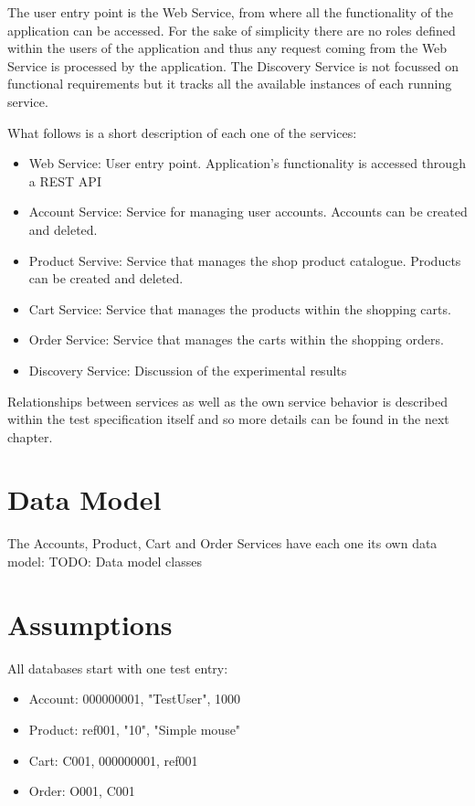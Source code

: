 The user entry point is the Web Service, from where all the functionality of the application can be accessed. For the sake of simplicity there are no roles defined within the users of the application and thus any request coming from the Web Service is processed by the application.
The Discovery Service is not focussed on functional requirements but it tracks all the available instances of each running service.

What follows is a short description of each one of the services:
\begin{itemize}
\item Web Service: User entry point. Application's functionality is accessed through a REST API 
\item Account Service: Service for managing user accounts. Accounts can be created and deleted.
\item Product Servive: Service that manages the shop product catalogue. Products can be created and deleted.
\item Cart Service: Service that manages the products within the shopping carts.
\item Order Service: Service that manages the carts within the shopping orders.
\item Discovery Service: Discussion of the experimental results
\end{itemize}

Relationships between services as well as the own service behavior is described within the test specification itself and so more details can be found in the next chapter. 


\section{Data Model}

The Accounts, Product, Cart and Order Services have each one its own data model:
TODO: Data model classes


\section{Assumptions}

All databases start with one test entry:

\begin{itemize}
\item Account: 000000001, "TestUser", 1000
\item Product: ref001, "10", "Simple mouse"
\item Cart: C001, 000000001, ref001
\item Order: O001, C001
\end{itemize}
